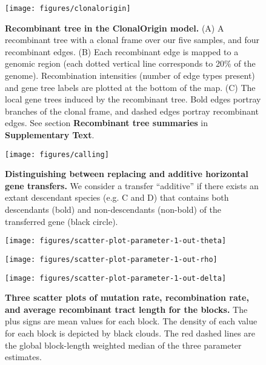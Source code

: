 \documentclass[12pt]{article}
\providecommand{\\}{\\}
\begin{document}
\begin{figure}[!ht]
\texttt{[image: figures/clonalorigin]}
\caption[Recombinant tree in the ClonalOrigin model]{
{\bf Recombinant tree in the ClonalOrigin model.}
(A) A recombinant tree with a clonal frame over our five samples, and four
recombinant edges.  (B) Each recombinant edge is mapped to a genomic region
(each dotted vertical line corresponds to 20\% of the genome). Recombination
intensities (number of edge types present) and gene tree labels are plotted at
the bottom of the map. (C) The local gene trees induced by the recombinant tree. 
Bold edges portray branches of the clonal frame, and dashed edges portray
recombinant edges. See section \textbf{Recombinant tree summaries} in
\textbf{Supplementary Text}.}
\label{fig:clonalorigin}
\end{figure}
\clearpage{}%

\begin{figure}
\begin{center}
\texttt{[image: figures/calling]}
\end{center}
\caption[Distinguishing between replacing and additive gene HGT]{
{\bf Distinguishing between replacing and additive horizontal gene transfers.}
We consider a transfer ``additive'' if there exists an extant descendant species
(e.g. C and D) that contains both descendants (bold) and
non-descendants (non-bold) of the transferred gene (black circle).}
\label{fig:calling-transfers}
\end{figure}
\clearpage{}%

\begin{figure}[!ht]
\begin{center}
\texttt{[image: figures/scatter-plot-parameter-1-out-theta]}

\texttt{[image: figures/scatter-plot-parameter-1-out-rho]}

\texttt{[image: figures/scatter-plot-parameter-1-out-delta]}
\end{center}
\caption[Three scatter plots of population parameters]{
{\bf Three scatter plots of mutation rate, recombination
rate, and average recombinant tract length for the blocks.} The plus signs are mean values
for each block. The density of each value for each block is depicted by black
clouds.  The red dashed lines are the global block-length weighted median of the
three parameter estimates.}\label{fig:scatter3}
\end{figure}
\clearpage{}%
\end{document}
